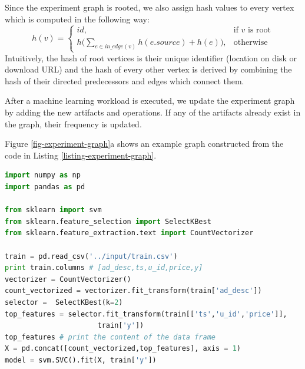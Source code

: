 Since the experiment graph is rooted, we also assign hash values to every vertex which is computed in the following way:
\[
    h(v)= 
\begin{cases}
    id,& \text{if } v \text{ is root}\\
    h\Big(\sum\limits_{e \in in\_edge(v)} h(e.source) + h(e)\Big)  ,              & \text{otherwise}
\end{cases}
\]
Intuitively, the hash of root vertices is their unique identifier (location on disk or download URL) and the hash of every other vertex is derived by combining the hash of their directed predecessors and edges which connect them.

After a machine learning workload is executed, we update the experiment graph by adding the new artifacts and operations.
If any of the artifacts already exist in the graph, their frequency is updated.

Figure \ref{fig-experiment-graph}a shows an example graph constructed from the code in Listing \ref{listing-experiment-graph}.

\begin{lstlisting}[language=Python, caption=Example script,captionpos=b,label = {listing-experiment-graph}]
import numpy as np
import pandas as pd

from sklearn import svm
from sklearn.feature_selection import SelectKBest
from sklearn.feature_extraction.text import CountVectorizer

train = pd.read_csv('../input/train.csv') 
print train.columns # [ad_desc,ts,u_id,price,y]
vectorizer = CountVectorizer()
count_vectorized = vectorizer.fit_transform(train['ad_desc'])
selector =  SelectKBest(k=2)
top_features = selector.fit_transform(train[['ts','u_id','price']], 
				      train['y'])
top_features # print the content of the data frame			     
X = pd.concat([count_vectorized,top_features], axis = 1)
model = svm.SVC().fit(X, train['y'])
\end{lstlisting}

